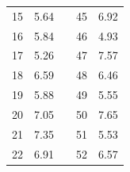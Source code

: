 \begin{table}[H]
\begin{tabular}{|r|r|l|r|r|}
  15                                                        & 5.64                                                      &  & 45                                                                              & 6.92                                                                             \\ \cline{1-2} \cline{4-5} 
  16                                                        & 5.84                                                      &  & 46                                                                              & 4.93                                                                             \\ \cline{1-2} \cline{4-5} 
  17                                                        & 5.26                                                      &  & 47                                                                              & 7.57                                                                             \\ \cline{1-2} \cline{4-5} 
  18                                                        & 6.59                                                      &  & 48                                                                              & 6.46                                                                             \\ \cline{1-2} \cline{4-5} 
  19                                                        & 5.88                                                      &  & 49                                                                              & 5.55                                                                             \\ \cline{1-2} \cline{4-5} 
  20                                                        & 7.05                                                      &  & 50                                                                              & 7.65                                                                             \\ \cline{1-2} \cline{4-5} 
  21                                                        & 7.35                                                      &  & 51                                                                              & 5.53                                                                             \\ \cline{1-2} \cline{4-5} 
  22                                                        & 6.91                                                      &  & 52                                                                              & 6.57                                                                             \\ \cline{1-2} \cline{4-5} 

\end{tabular}
\end{table}
